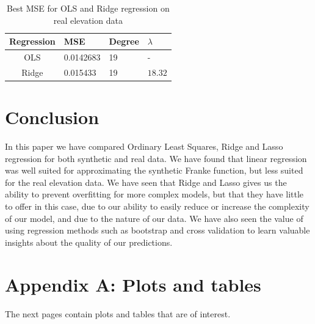 \documentclass[twocolumn,10pt,cleanfoot]{asme2ej}
\begin{document}
\begin{table}[t]
\caption{Best MSE for OLS and Ridge regression on real elevation data}
\begin{center}
\label{ols_vs_ridge_vs_lasso_table_real}
\begin{tabular}{c | l l l}
Regression & MSE & Degree & $\lambda$ \\
\hline
OLS & 0.0142683 & 19 & - \\
Ridge & 0.015433 & 19 & $18.32$ \\
\hline
\end{tabular}
\end{center}
\end{table}

\section{Conclusion}

In this paper we have compared Ordinary Least Squares, Ridge and Lasso regression for both synthetic and real data. We have found that linear regression was well suited for approximating the synthetic Franke function, but less suited for the real elevation data. We have seen that Ridge and Lasso gives us the ability to prevent overfitting for more complex models, but that they have little to offer in this case, due to our ability to easily reduce or increase the complexity of our model, and due to the nature of our data. We have also seen the value of using regression methods such as bootstrap and cross validation to learn valuable insights about the quality of our predictions.




\section*{Appendix A: Plots and tables}

The next pages contain plots and tables that are of interest.
\end{document}
